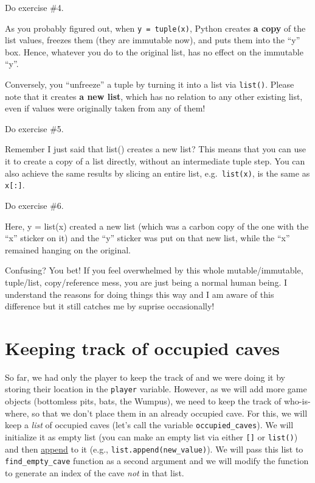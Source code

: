 \documentclass[
]{book}
\begin{document}
Do exercise \#4.

As you probably figured out, when \texttt{y\ =\ tuple(x)}, Python creates \textbf{a copy} of the list values, freezes them (they are immutable now), and puts them into the ``y'' box. Hence, whatever you do to the original list, has no effect on the immutable ``y''.

Conversely, you ``unfreeze'' a tuple by turning it into a list via \texttt{list()}. Please note that it creates \textbf{a new list}, which has no relation to any other existing list, even if values were originally taken from any of them!

Do exercise \#5.

Remember I just said that list() creates a new list? This means that you can use it to create a copy of a list directly, without an intermediate tuple step. You can also achieve the same results by slicing an entire list, e.g.~\texttt{list(x)}, is the same as \texttt{x{[}:{]}}.

Do exercise \#6.

Here, y = list(x) created a new list (which was a carbon copy of the one with the ``x'' sticker on it) and the ``y'' sticker was put on that new list, while the ``x'' remained hanging on the original.

Confusing? You bet! If you feel overwhelmed by this whole mutable/immutable, tuple/list, copy/reference mess, you are just being a normal human being. I understand the reasons for doing things this way and I am aware of this difference but it still catches me by suprise occasionally!

\hypertarget{keeping-track-of-occupied-caves}{%
\section{Keeping track of occupied caves}\label{keeping-track-of-occupied-caves}}

So far, we had only the player to keep the track of and we were doing it by storing their location in the \texttt{player} variable. However, as we will add more game objects (bottomless pits, bats, the Wumpus), we need to keep the track of who-is-where, so that we don't place them in an already occupied cave. For this, we will keep a \emph{list} of occupied caves (let's call the variable \texttt{occupied\_caves}). We will initialize it as empty list (you can make an empty list via either \texttt{{[}{]}} or \texttt{list()}) and then \href{https://docs.python.org/3.8/tutorial/datastructures.html\#more-on-lists}{append} to it (e.g., \texttt{list.append(new\_value)}). We will pass this list to \texttt{find\_empty\_cave} function as a second argument and we will modify the function to generate an index of the cave \emph{not} in that list.
\end{document}
